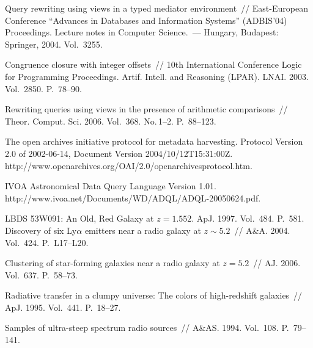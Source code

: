 \begin{multicols}{2}
{{\begin{thebibliography}{99}
Query rewriting using views in a typed mediator environment~// East-European Conference
``Advances in Data\-bases and Information Systems'' (ADBIS'04) Proceedings.
 Lecture notes in Computer Science.~--- Hungary, Budapest: Springer, 2004. Vol.~3255.

Congruence closure with integer offsets~// 10th International Conference Logic for
Programming Proceedings. Artif. Intell. and Reasoning (LPAR). LNAI.  2003. Vol.~2850.
P.~78--90.

Rewriting queries using views in the presence of arithmetic comparisons~// Theor. Comput. Sci.
2006.  Vol.~368. No.\,1--2.  P.~88--123.

The open archives initiative protocol for metadata harvesting. Protocol Version 2.0
of 2002-06-14, Document Version 2004/10/12T15:31:00Z. {\sf
http://www.\linebreak openarchives.org/OAI/2.0/openarchivesprotocol.htm}.

IVOA Astronomical Data Query Language Version 1.01. {\sf
http://www.ivoa.net/Documents/WD/ADQL/ADQL-20050624.pdf}.

LBDS 53W091: An Old, Red Galaxy at $z=1.552$. ApJ. 1997. Vol.~484. P.~581.
Discovery of six Ly$\alpha$ emitters near a radio galaxy at $z\sim 5.2$~// A\&A. 2004.
Vol.~424. P.~L17--L20.

Clustering of star-forming galaxies near a radio galaxy at $z=5.2$~//  AJ. 2006. Vol.~637.
P.~58--73.

Radiative transfer in a clumpy universe: The colors of high-redshift galaxies~//  ApJ. 1995.
Vol.~441. P.~18--27.

Samples of ultra-steep spectrum radio sources~// A\&AS. 1994. Vol.~108. P.~79--141.


\end{thebibliography}}}
\end{multicols}
